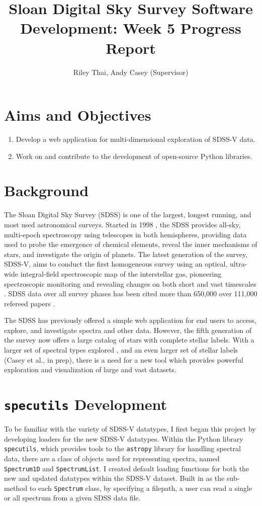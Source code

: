 \documentclass[a4paper,10pt,twocolumn]{article}
\title{Sloan Digital Sky Survey Software Development: Week 5 Progress Report}
\author{Riley Thai, Andy Casey (Supervisor)}
\begin{document}
\maketitle
\section{Aims and Objectives}
\begin{enumerate}
	\item Develop a web application for multi-dimensional exploration of SDSS-V data.
	\item Work on and contribute to the development of open-source Python libraries.
\end{enumerate}

\section{Background}
The Sloan Digital Sky Survey (SDSS) is one of the largest, longest running, and most used astronomical surveys. Started in 1998 \parencite{dr18}, the SDSS provides all-sky, multi-epoch spectroscopy using telescopes in both hemispheres, providing data used to probe the emergence of chemical elements, reveal the inner mechanisms of stars, and investigate the origin of planets. The latest generation of the survey, SDSS-V, aims to conduct the first homogeneous survey using an optical, ultra-wide integral-field spectroscopic map of the interstellar gas, pioneering spectroscopic monitoring and revealing changes on both short and vast timescales \parencite{SDSS2017}. SDSS data over all survey phases has been cited more than 650,000 over 111,000 refereed papers \parencite{dr18}.

The SDSS has previously offered a simple web application for end users to access, explore, and investigate spectra and other data. However, the fifth generation of the survey now offers a large catalog of stars with complete stellar labels. With a larger set of spectral types explored \parencite{apogee2017}, and an even larger set of stellar labels (Casey et al., in prep), there is a need for a new tool which provides powerful exploration and visualization of large and vast datasets.

\section{\texttt{specutils} Development}
To be familiar with the variety of SDSS-V datatypes, I first began this project by developing loaders for the new SDSS-V datatypes. Within the Python library \texttt{specutils}, which provides tools to the \texttt{astropy} library for handling spectral data, there are a class of objects used for representing spectra, named  \texttt{Spectrum1D} and \texttt{SpectrumList}. I created default loading functions for both the new and updated datatypes within the SDSS-V dataset. Built in as the sub-method to each \texttt{Spectrum} class, by specifying a filepath, a user can read a single or all spectrum from a given SDSS data file.
\end{document}
